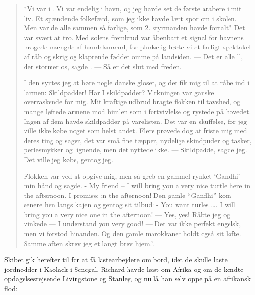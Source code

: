 \begin{quote}

    ``Vi var i . Vi var endelig i havn, og jeg havde set de
    første arabere i mit liv. Et spændende folkefærd, som jeg ikke havde
    lært spor om i skolen. Men var de alle sammen så farlige, som 2.
    styrmanden havde fortalt? Det var svært at tro. Med solens frembrud
    var åbenbart et signal for havnens brogede mængde af handelsmænd, for
    pludselig hørte vi et farligt spektakel af råb og skrig og klaprende
    fødder omme på landsiden. --- Det er alle
    '', der stormer os, sagde
    .  --- Så er det slut med freden. 
    
    I den  syntes jeg at høre nogle danske gloser, og det fik mig
    til at råbe ind i larmen: Skildpadder!  Har I skildpadder? Virkningen
    var ganske overraskende for mig. Mit kraftige udbrud bragte flokken
    til tavshed, og mange løftede armene mod himlen som i fortvivlelse og
    rystede på hovedet. Ingen af dem havde skildpadder på varelisten. Det
    var en skuffelse, for jeg ville ikke købe noget som helst andet.
    Flere prøvede dog at friste mig med deres ting og sager, det var små
    fine tæpper, nydelige skindpuder og tasker, perlesmykker og lignende,
    men det nyttede ikke. --- Skildpadde, sagde jeg. Det ville jeg købe,
    gentog jeg. 
    
    Flokken var ved at opgive mig, men så greb en gammel rynket `Gandhi'
    min hånd og sagde. - My friend -- I will bring you a very nice turtle
    here in the afternoon. I promise; in the afternoon! Den gamle
    ``Gandhi'' kom senere hen langs kajen og gentog sit tilbud: - You
    want turles \ldots{}. I will bring you a very nice one in the
    afternoon! --- Yes, yes! Råbte jeg og vinkede --- I understand you
    very good! --- Det var ikke perfekt engelsk, men vi forstod hinanden.
    Og den gamle marokkaner holdt også sit løfte.  Samme aften skrev jeg
    et langt brev hjem.''.
    
\end{quote}

Skibet gik herefter til  for at få lastearbejdere om bord,
idet de skulle laste jordnødder i Kaolack i Senegal. Richard havde læst
om Afrika og om de kendte opdagelsesrejsende Livingstone og Stanley, og
nu lå han selv oppe på en afrikansk flod: 

